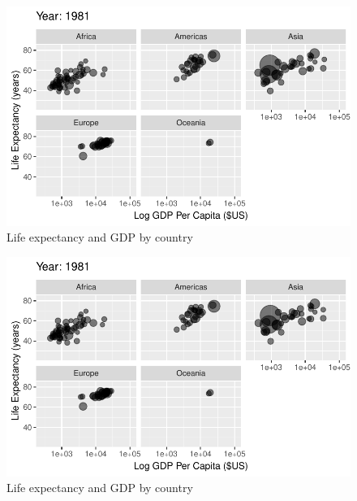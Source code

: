 \documentclass[
  letterpaper,
  DIV=11,
  numbers=noendperiod]{scrreport}
\theoremstyle{definition}
\theoremstyle{remark}
\begin{document}
\begin{figure}

{\centering \includegraphics{index_files/figure-pdf/fig-anim-lifegdp-53.pdf}

}

\caption{\label{fig-anim-lifegdp-53}Life expectancy and GDP by country}

\end{figure}

\begin{figure}

{\centering \includegraphics{index_files/figure-pdf/fig-anim-lifegdp-54.pdf}

}

\caption{\label{fig-anim-lifegdp-54}Life expectancy and GDP by country}

\end{figure}
\end{document}

